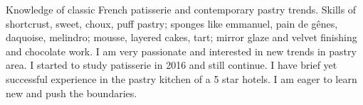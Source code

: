

\begin{cvparagraph}

Knowledge of classic French patisserie and contemporary pastry trends. Skills of shortcrust, sweet, choux, puff pastry; sponges like emmanuel, pain de gênes, daquoise, melindro; mousse, layered cakes, tart; mirror glaze and velvet finishing and chocolate work. I am very passionate and interested in new trends in pastry area. I started to study patisserie in 2016 and still continue. I have brief yet successful experience in the pastry kitchen of a 5 star hotels. I am eager to learn new and push the boundaries.
\end{cvparagraph}
